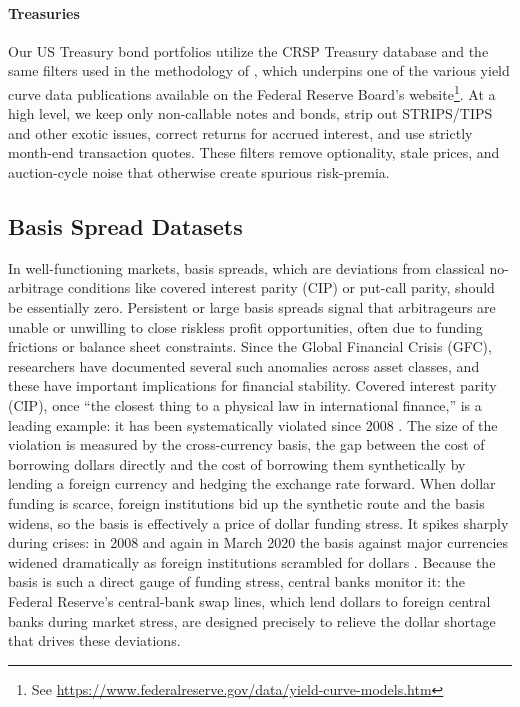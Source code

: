 \documentclass{article}
\begin{document}
\paragraph{Treasuries}
Our US Treasury bond portfolios utilize the CRSP Treasury database and the same filters used in the methodology of \cite{Gurkaynak2007}, which underpins one of the
various yield curve data publications available on the Federal Reserve Board's website\footnote{See \url{https://www.federalreserve.gov/data/yield-curve-models.htm}}. At a high level, we keep only non-callable notes and bonds, strip out STRIPS/TIPS and other exotic issues, correct returns for accrued interest, and use strictly month-end transaction quotes. These filters remove optionality, stale prices, and auction-cycle noise that otherwise create spurious risk-premia.

\subsection{Basis Spread Datasets}

In well-functioning markets, basis spreads, which are deviations from classical no-arbitrage conditions like covered interest parity (CIP) or put-call parity, should be essentially zero. Persistent or large basis spreads signal that arbitrageurs are unable or unwilling to close riskless profit opportunities, often due to funding frictions or balance sheet constraints. Since the Global Financial Crisis (GFC), researchers have documented several such anomalies across asset classes, and these have important implications for financial stability.
Covered interest parity (CIP), once ``the closest thing to a physical law in international finance,'' is a leading example: it has been systematically violated since 2008 \citep{Du2018}. The size of the violation is measured by the cross-currency basis, the gap between the cost of borrowing dollars directly and the cost of borrowing them synthetically by lending a foreign currency and hedging the exchange rate forward. When dollar funding is scarce, foreign institutions bid up the synthetic route and the basis widens, so the basis is effectively a price of dollar funding stress. It spikes sharply during crises: in 2008 and again in March 2020 the basis against major currencies widened dramatically as foreign institutions scrambled for dollars \citep{BoardofGovernorsoftheFederalReserveSystem2020}.
Because the basis is such a direct gauge of funding stress, central banks monitor it: the Federal Reserve's central-bank swap lines, which lend dollars to foreign central banks during market stress, are designed precisely to relieve the dollar shortage that drives these deviations.
\end{document}
